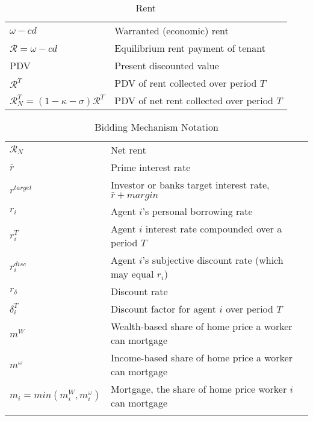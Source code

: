 \newpage

\begin{longtable}{lp{10cm}}
\caption{Rent}                                                            \\
\hline
$\omega-{c} d$                &  Warranted (economic) rent                \\
$\mathcal{R}=\omega-{c} d$    &  Equilibrium rent payment of tenant       \\
PDV                           &  Present discounted value                 \\  
$\mathcal{R}^T$               &  PDV of rent collected over period $T$    \\ 
$\mathcal{R}^T_N=(1-\kappa-\sigma)\mathcal{R}^T$  &  PDV of net rent collected over period $T$ \\
\hline
\end{longtable}

\begin{longtable}{lp{10cm}}
\caption{Bidding Mechanism Notation}                                          \\
\hline
$\mathcal{R}_N$  &  Net rent                                                  \\ %
$\bar r$         &  Prime interest rate                                       \\
$r^{target}$     &  Investor or banks target interest rate, $\bar r + margin$ \\
$r_i$            &  Agent $i$'s personal borrowing rate                       \\
$r_i^T$          &  Agent $i$ interest rate compounded over a period $T$      \\
$r_i^{disc}$     &  Agent $i$'s subjective discount rate (which may equal $r_i$) \\
$r_\delta$       &  Discount rate                                             \\ %
$\delta_i^T$     &  Discount factor for agent $i$ over period $T$             \\
$m^W$            &  Wealth-based share of home price a worker can mortgage    \\ %
$m^\omega$       &  Income-based share of home price a worker can mortgage    \\ %
$m_i = min(m^W_i, m^\omega_i)$  & Mortgage, the share of home price worker $i$ can mortgage \\

\hline
\color{black}
\end{longtable}  

